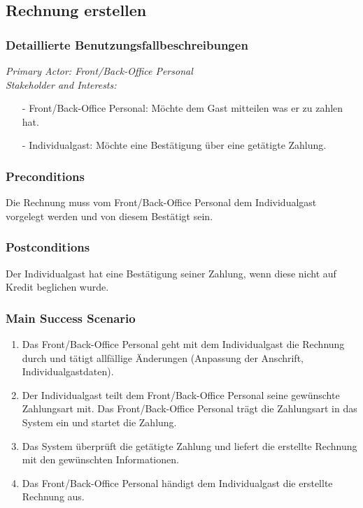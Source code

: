 \documentclass[./detailed_overview_usecases.tex]{subfiles}
\begin{document}
    \subsection{Rechnung erstellen}
    \subsubsection{Detaillierte Benutzungsfallbeschreibungen}
    \textit{Primary Actor: Front/Back-Office Personal}
    \\
    \textit{Stakeholder and Interests:}
    \begin{itemize}
        \item[-] Front/Back-Office Personal: Möchte dem Gast mitteilen was er zu zahlen hat.
        \item[-] Individualgast: Möchte eine Bestätigung über eine getätigte Zahlung.
    \end{itemize}

    \subsubsection*{Preconditions}
	Die Rechnung muss vom Front/Back-Office Personal dem Individualgast vorgelegt werden und von diesem Bestätigt sein.

    \subsubsection*{Postconditions}
    Der Individualgast hat eine Bestätigung seiner Zahlung, wenn diese nicht auf Kredit beglichen wurde.

    \subsubsection*{Main Success Scenario}
    \begin{enumerate}
        \item Das Front/Back-Office Personal geht mit dem Individualgast die Rechnung durch und tätigt allfällige Änderungen (Anpassung der Anschrift, Individualgastdaten).
		\item Der Individualgast teilt dem Front/Back-Office Personal seine gewünschte Zahlungsart mit. Das Front/Back-Office Personal trägt die Zahlungsart in das System ein und startet die Zahlung.
        \item Das System überprüft die getätigte Zahlung und liefert die erstellte Rechnung mit den gewünschten Informationen.
        \item Das Front/Back-Office Personal händigt dem Individualgast die erstellte Rechnung aus.
    \end{enumerate}
\end{document}
